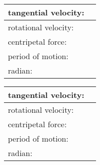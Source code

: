 \documentclass[12pt,landscape]{article}
\begin{document}
\pagestyle{empty}

\newcommand{\mycontent}{
  \def\myend{\\[8em]\hline}

  \begin{tabular}{l|p{2.9in}}
    \hline
    tangential velocity: & \myend
    rotational velocity: & \myend
    centripetal force:   & \myend \hline
    period of motion:    & \myend
    radian:              & \myend
  \end{tabular}
}

\begin{multicols*}{2}

  \mycontent

  \columnbreak

  \mycontent

\end{multicols*}
\end{document}
